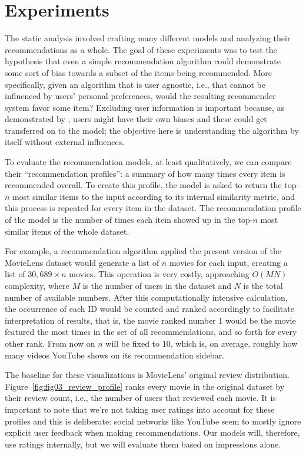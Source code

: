 \section{Experiments}
\label{sec:experiments}

The static analysis involved crafting many different models and analyzing their
recommendations as a whole. The goal of these experiments was to test the
hypothesis that even a simple recommendation algorithm could demonstrate some
sort of bias towards a subset of the items being recommended. More specifically,
given an algorithm that is user agnostic, i.e., that cannot be influenced by
users' personal preferences, would the resulting recommender system favor some
item? Excluding user information is important because, as demonstrated by
\citet{stoica_algorithmic_2018}, users might have their own biases and these
could get transferred on to the model; the objective here is understanding the
algorithm by itself without external influences.

To evaluate the recommendation models, at least qualitatively, we can compare
their ``recommendation profiles'': a summary of how many times every item is
recommended overall. To create this profile, the model is asked to return the
top-$n$ most similar items to the input according to its internal similarity
metric, and this process is repeated for every item in the dataset. The
recommendation profile of the model is the number of times each item showed up
in the top-$n$ most similar items of the whole dataset.

For example, a recommendation algorithm applied the present version of the
MovieLens dataset would generate a list of $n$ movies for each input, creating a
list of $30,689 \times n$ movies. This operation is very costly, approaching
$O(MN)$ complexity, where $M$ is the number of users in the dataset and $N$ is
the total number of available numbers. After this computationally intensive
calculation, the occurrence of each ID would be counted and ranked accordingly
to facilitate interpretation of results, that is, the movie ranked number 1
would be the movie featured the most times in the set of all recommendations,
and so forth for every other rank. From now on $n$ will be fixed to 10, which
is, on average, roughly how many videos YouTube shows on its recommendation
sidebar.


The baseline for these visualizations is MovieLens' original review
distribution. Figure~\ref{fig:fig03_review_profile} ranks every movie in the
original dataset by their review count, i.e., the number of users that reviewed
each movie. It is important to note that we're not taking user ratings into
account for these profiles and this is deliberate: social networks like YouTube
seem to mostly ignore explicit user feedback when making recommendations. Our
models will, therefore, use ratings internally, but we will evaluate them based
on impressions alone.

